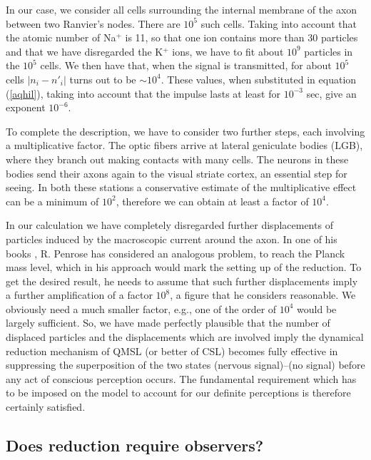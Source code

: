 \documentclass[12pt]{article}
\begin{document}
In our case, we consider all cells surrounding the internal
membrane of the axon between two Ranvier's nodes. There are
$10^{5}$ such cells. Taking into account that the atomic number of
Na$^{+}$ is 11, so that one ion contains more than 30 particles
and that we have disregarded the K$^{+}$ ions, we have to fit
about $10^{9}$ particles in the $10^{5}$ cells. We then have that,
when the signal is transmitted, for about $10^{5}$ cells $|n_{i} -
{n'}_{i}|$ turns out to be $\sim 10^{4}$. These values, when
substituted in equation (\ref{aqhil}), taking into account that
the impulse lasts at least for $10^{-3}$ sec, give an exponent
$10^{-6}$.

To complete the description, we have to consider two further
steps, each involving a multiplicative factor. The optic fibers
arrive at lateral geniculate bodies (LGB), where they branch out
making contacts with many cells. The neurons in these bodies send
their axons again to the visual striate cortex, an essential step
for seeing. In both these stations a conservative estimate of the
multiplicative effect \cite{hub} can be a minimum of $10^{2}$,
therefore we can obtain at least a factor of $10^{4}$.

In our calculation we have completely disregarded further
displacements of particles induced by the macroscopic current
around the axon. In one of his books \cite{penenm}, R. Penrose has
considered an analogous problem, to reach the Planck mass level,
which in his approach would mark the setting up of the reduction.
To get the desired result, he needs to assume that such further
displacements imply a further amplification of a factor $10^{8}$,
a figure that he considers reasonable. We obviously need a much
smaller factor, e.g., one of the order of $10^{4}$ would be
largely sufficient. So, we have made perfectly plausible that the
number of displaced particles and the displacements which are
involved imply the dynamical reduction mechanism of QMSL (or
better of CSL) becomes fully effective in suppressing the
superposition of the two states (nervous signal)--(no signal)
before any act of conscious perception occurs. The fundamental
requirement which has to be imposed on the model to account for
our definite perceptions is therefore certainly satisfied.


\subsection{Does reduction require observers?} \label{sec144}
\end{document}
